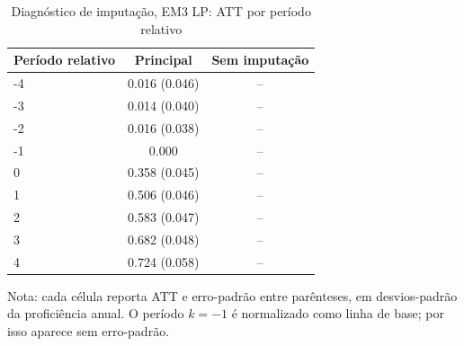 \begin{table}[!htbp]
\centering
\caption{Diagnóstico de imputação, EM3 LP: ATT por período relativo}
\label{tab:ap_event_imputacao_em3_lp}
\vspace{-0.15cm}
\scriptsize
\setlength{\tabcolsep}{4pt}
\renewcommand{\arraystretch}{0.92}
\begin{tabular}{lcc}
\toprule
Período relativo & Principal & Sem imputação \\
\midrule
-4 & 0.016 (0.046) & -- \\
-3 & 0.014 (0.040) & -- \\
-2 & 0.016 (0.038) & -- \\
-1 & 0.000 & -- \\
0 & 0.358 (0.045) & -- \\
1 & 0.506 (0.046) & -- \\
2 & 0.583 (0.047) & -- \\
3 & 0.682 (0.048) & -- \\
4 & 0.724 (0.058) & -- \\
\bottomrule
\end{tabular}
\begin{flushleft}
\footnotesize Nota: cada célula reporta ATT e erro-padrão entre parênteses, em desvios-padrão da proficiência anual. O período \(k=-1\) é normalizado como linha de base; por isso aparece sem erro-padrão.
\end{flushleft}
\end{table}
